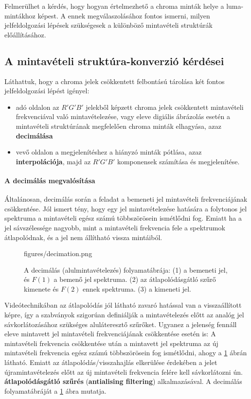 Felmerülhet a kérdés, hogy hogyan értelmezhető a chroma minták helye a luma-mintákhoz képest.
A ennek megválaszolásához fontos ismerni, milyen jelfeldolgozási lépések szükségesek a különböző mintavételi struktúrák előállításához.

\subsection{A mintavételi struktúra-konverzió kérdései}

Láthattuk, hogy a chroma jelek csökkentett felbontású tárolása két fontos jelfeldolgozási lépést igényel:
\begin{itemize}
\item adó oldalon az $R'G'B'$ jelekből képzett chroma jelek csökkentett mintavételi frekvenciával való mintavételezése, vagy eleve digiális ábrázolás esetén a mintavételi struktúrának megfelelően chroma minták elhagyása, azaz \textbf{decimálása}
\item vevő oldalon a megjelenítéshez a hiányzó minták pótlása, azaz \textbf{interpolációja}, majd az $R'G'B'$ komponensek számítása és megjelenítése.
\end{itemize}

\paragraph{A decimálás megvalósítása}
Általánosan, decimálás során a feladat a bemeneti jel mintavételi frekvenciájának csökkentése.
Jól ismert tény, hogy egy jel mintavételezése hatására a folytonos jel spektruma a mintavételi egész számú többszörösein ismétlődni fog.
Emiatt ha a jel sávszélessége nagyobb, mint a mintavételi frekvencia fele a spektrumok átlapolódnak, és a jel nem állítható vissza mintáiból.
\begin{figure}[]
	\centering
	\begin{overpic}[width = 0.8\columnwidth ]{figures/decimation.png}
 	\end{overpic}
	\caption{A decimálás (alulmintavételezés) folyamatábrája: 
	(1) a bemeneti jel, és $F(1)$ a bemenő jel spektruma.
	(2) az átlapolódásgátló szűrő kimenete és $F(2)$ ennek spektruma.
	(3) a kimeneti jel.}
	\label{Fig:decimation}
\end{figure}
Videótechnikában az átlapolódás jól látható zavaró hatással van a visszaállított képre, így a szabványok szigorúan definiálják a mintavételezés előtt az analóg jel sávkorlátozásához szükséges aluláteresztő szűrőket.
Ugyanez a jelenség fennáll eleve mintavett jel mintavételi frekvenciájának csökkentése esetén is:
A mintavételi frekvencia csökkentése után a mintavett jel spektruma az új mintavételi frekvencia egész számú többszörösein fog ismétlődni, ahogy a \ref{Fig:decimation} ábrán látható.
Emiatt az átlapolódás/visszahajlás elkerülése érdekében a jelet újramintavételezés előtt az új mintavételi frekvencia felére kell sávkorlátozni ún. \textbf{átlapolódásgátló szűrés} (\textbf{antialising filtering}) alkalmazásával.
A decimálás folyamatábráját a \ref{Fig:decimation} ábra mutatja.

